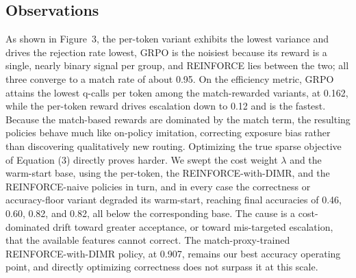 \documentclass[11pt]{article}
\begin{document}
\subsection{Observations}
As shown in Figure~3, the per-token variant exhibits the lowest variance and drives the rejection rate
lowest, GRPO is the noisiest because its reward is a single, nearly binary signal per group, and
REINFORCE lies between the two; all three converge to a match rate of about 0.95. On the efficiency
metric, GRPO attains the lowest q-calls per token among the match-rewarded variants, at 0.162, while
the per-token reward drives escalation down to 0.12 and is the fastest. Because the match-based rewards
are dominated by the match term, the resulting policies behave much like on-policy imitation,
correcting exposure bias rather than discovering qualitatively new routing. Optimizing the true sparse
objective of Equation (3) directly proves harder. We swept the cost weight $\lambda$ and the warm-start
base, using the per-token, the REINFORCE-with-DIMR, and the REINFORCE-naive policies in turn, and in
every case the correctness or accuracy-floor variant degraded its warm-start, reaching final accuracies
of 0.46, 0.60, 0.82, and 0.82, all below the corresponding base. The cause is a cost-dominated drift
toward greater acceptance, or toward mis-targeted escalation, that the available features cannot
correct. The match-proxy-trained REINFORCE-with-DIMR policy, at 0.907, remains our best accuracy
operating point, and directly optimizing correctness does not surpass it at this scale.
\end{document}

